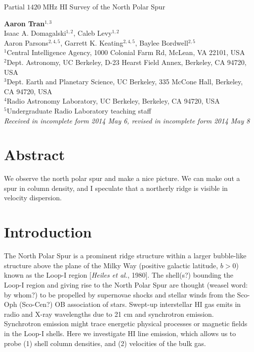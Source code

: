 \documentclass[10pt]{article}
\newcommand {\mt}{\mathrm}
\newcommand {\unit}[1]{\; \mt{#1}}
\begin{document}
\begin{center}
\Large{Partial $1420\unit{MHz}$ HI Survey of the North Polar Spur}

\normalsize
\textbf{Aaron Tran}${}^{1,3}$ \\
Isaac A. Domagalski${}^{1,2}$, Caleb Levy${}^{1,2}$ \\
Aaron Parsons${}^{2,4,5}$, Garrett K. Keating${}^{2,4,5}$, Baylee Bordwell${}^{2,5}$ \\
\footnotesize
${}^1$Central Intelligence Agency, 1000 Colonial Farm Rd, McLean, VA 22101, USA \\
${}^2$Dept. Astronomy, UC Berkeley, D-23 Hearst Field Annex, Berkeley, CA 94720, USA \\
${}^3$Dept. Earth and Planetary Science, UC Berkeley, 335 McCone Hall, Berkeley, CA 94720, USA \\
${}^4$Radio Astronomy Laboratory, UC Berkeley, Berkeley, CA 94720, USA \\
${}^5$Undergraduate Radio Laboratory teaching staff \\
\textit{Received in incomplete form 2014 May 6, revised in incomplete form 2014 May 8}
\end{center}

\section*{Abstract}

We observe the north polar spur and make a nice picture.  We can make out a spur in column density, and I speculate that a northerly ridge is visible in velocity dispersion.

\section{Introduction}

The North Polar Spur is a prominent ridge structure within a larger bubble-like structure above the plane of the Milky Way (positive galactic latitude, $b>0$) known as the Loop-I region [\textit{Heiles et al.}, 1980].  The shell(s?) bounding the Loop-I region and giving rise to the North Polar Spur are thought (weasel word: by whom?) to be propelled by supernovae shocks and stellar winds from the Sco-Oph (Sco-Cen?) OB association of stars.  Swept-up interstellar HI gas emits in radio and X-ray wavelengths due to 21 cm and synchrotron emission.
Synchrotron emission might trace energetic physical processes or magnetic fields in the Loop-I shells.  Here we investigate HI line emission, which allows us to probe (1) shell column densities, and (2) velocities of the bulk gas.
\end{document}
